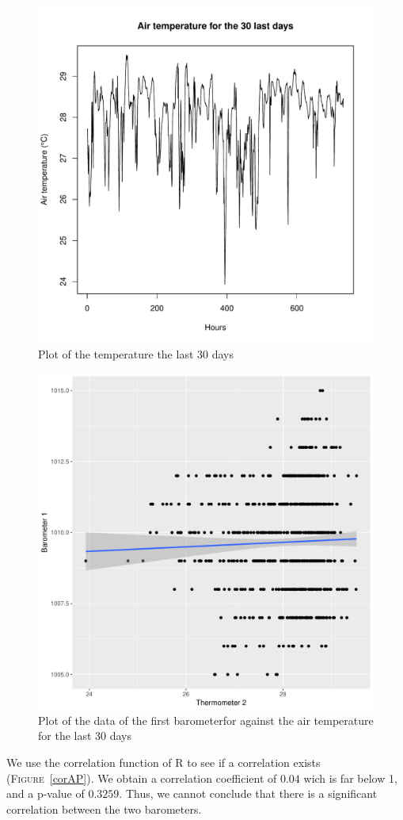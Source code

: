 \documentclass[12pt,a4paper]{article}
\begin{document}
\begin{figure}
    \begin{center}
        \includegraphics[width=0.6\linewidth]{Air2.pdf}
        \caption{Plot of the temperature the last 30 days}
        \label{air2}
    \end{center}
\end{figure}
\begin{figure}
    \begin{center}
        \includegraphics[width=0.6\linewidth]{PresTemp.pdf}
        \caption{Plot of the data of the first barometerfor against the air temperature for the last 30 days}
        \label{prestemp}
    \end{center}
\end{figure}

We use the correlation function of R to see if a correlation exists (\textsc{Figure}~\ref{corAP}). We obtain a correlation coefficient of $0.04$ wich is far below 1, and a p-value of $0.3259$. Thus, we cannot conclude that there is a significant correlation between the two barometers.
\end{document}
